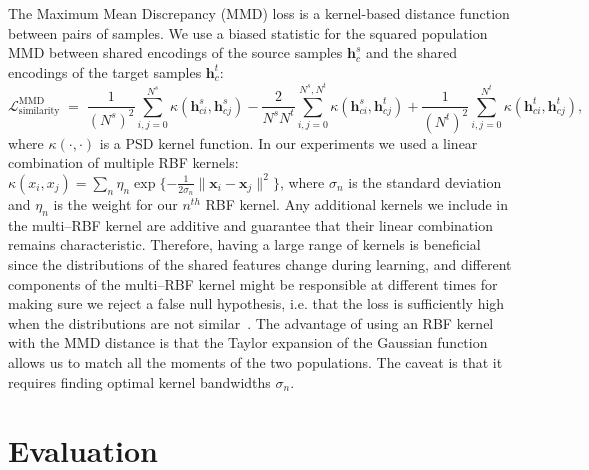 \documentclass{article}
\newcommand{\bs}[1]{\boldsymbol{\mathbf{#1}}}
\begin{document}
The Maximum Mean Discrepancy (MMD) loss \cite{gretton2012mmd} is a kernel-based
distance function between pairs of samples.
We use a biased statistic for the squared population MMD between shared encodings of the source samples $\bs h_c^s$ and the shared encodings of the target samples $\bs h_c^t$:
\begin{equation}
\label{eq:mmd}
\mathcal {L}_\mathrm{similarity}^\mathrm{MMD}\;=\; \displaystyle \frac{1}{(N^s)^2} \sum_{i,j=0}^{N^s}\kappa(\bs h_{ci}^s, \bs h_{cj}^s)-\frac{2}{N^sN^t}\sum_{i,j=0}^{N^s,N^t}\kappa(\bs h_{ci}^s, \bs h_{cj}^t) + \frac{1}{(N^t)^2}\sum_{i,j=0}^{N^t}\kappa(\bs h_{ci}^t,\bs h_{cj}^t),
\end{equation}
where $\kappa(\cdot,\cdot)$ is a PSD kernel function. In our experiments we used a linear combination of multiple RBF kernels: $\kappa(x_i, x_j) = \sum_n \eta_n \exp \{-\frac{1}{2\sigma_n}\|\bs x_i - \bs x_j\|^2\}$, where $\sigma_n$ is the standard deviation and $\eta_n$ is the weight for our $n^{th}$ RBF kernel. Any additional kernels we include in the multi--RBF kernel are additive and guarantee that their linear combination remains characteristic. Therefore, having a large range of kernels is beneficial since the distributions of the shared features change during learning, and different components of the multi--RBF kernel might be responsible at different times for making sure we reject a false null hypothesis, i.e. that the loss is sufficiently high when the distributions are not similar~\cite{long2015learning}. The advantage of using an RBF kernel with the MMD distance is that the Taylor expansion of the Gaussian function allows us to match all the moments of the two populations. The caveat is that it requires finding optimal kernel bandwidths $\sigma_n$.







 \section{Evaluation}
\label{sec:experiments}
\vspace{-4mm}
\end{document}
